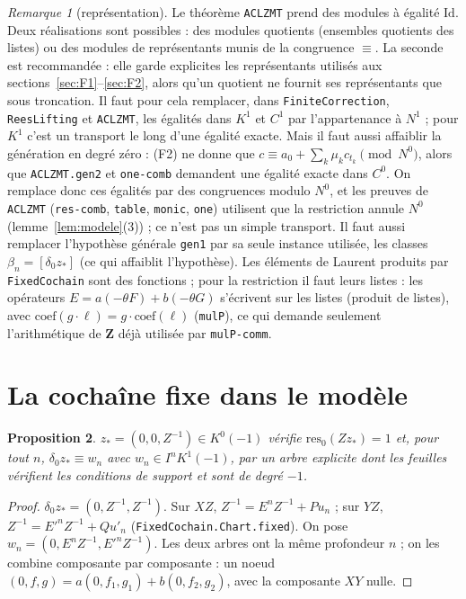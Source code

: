 \documentclass[11pt]{amsart}
\newtheorem{proposition}{Proposition}
\theoremstyle{remark}
\newtheorem{remark}[proposition]{Remarque}
\begin{document}
\begin{remark}[représentation]
Le théorème \texttt{ACLZMT} prend des modules à égalité $\mathrm{Id}$.
Deux réalisations sont possibles : des modules quotients (ensembles
quotients des listes) ou des modules de représentants munis de la
congruence $\equiv$. La seconde est recommandée : elle garde explicites
les représentants utilisés aux sections~\ref{sec:F1}--\ref{sec:F2}, alors
qu'un quotient ne fournit ses représentants que sous troncation. Il
faut pour cela remplacer, dans \texttt{FiniteCorrection},
\texttt{ReesLifting} et \texttt{ACLZMT}, les égalités dans $K^1$ et $C^1$
par l'appartenance à $N^1$ ; pour $K^1$ c'est un transport le long d'une
égalité exacte. Mais il faut aussi affaiblir la génération en degré zéro :
(F2) ne donne que $c\equiv a_0+\sum_k\mu_kc_{t_k}\pmod{N^0}$, alors que
\texttt{ACLZMT.gen2} et \texttt{one-comb} demandent une égalité exacte
dans $C^0$. On remplace donc ces égalités par des congruences modulo $N^0$,
et les preuves de \texttt{ACLZMT} (\texttt{res-comb}, \texttt{table},
\texttt{monic}, \texttt{one}) utilisent que la restriction annule $N^0$
(lemme~\ref{lem:modele}(3)) ; ce n'est pas un simple transport. Il faut aussi remplacer
l'hypothèse générale \texttt{gen1} par sa seule instance utilisée, les
classes $\beta_n=[\delta_0z_*]$ (ce qui affaiblit l'hypothèse).
Les éléments de Laurent produits par \texttt{FixedCochain} sont des
fonctions ; pour la restriction il faut leurs listes : les opérateurs
$E=a(-\theta F)+b(-\theta G)$ s'écrivent sur les listes (produit de
listes), avec $\text{coef}(g\cdot\ell)=g\cdot\text{coef}(\ell)$
(\texttt{mulP}), ce qui demande seulement l'arithmétique de $\mathbf Z$
déjà utilisée par \texttt{mulP-comm}.
\end{remark}

\section{La cochaîne fixe dans le modèle}

\begin{proposition}\label{prop:fixe}
$z_*=(0,0,Z^{-1})\in K^0(-1)$ vérifie $\mathrm{res}_0(Zz_*)=1$ et, pour
tout $n$, $\delta_0z_*\equiv w_n$ avec $w_n\in I^nK^1(-1)$, par un arbre
explicite dont les feuilles vérifient les conditions de support et sont
de degré $-1$.
\end{proposition}
\begin{proof}
$\delta_0z_*=(0,Z^{-1},Z^{-1})$. Sur $XZ$,
$Z^{-1}=E^nZ^{-1}+Pu_n$ ; sur $YZ$, $Z^{-1}=E'^nZ^{-1}+Qu'_n$
(\texttt{FixedCochain.Chart.fixed}). On pose
$w_n=(0,E^nZ^{-1},E'^nZ^{-1})$. Les deux arbres ont la même profondeur
$n$ ; on les combine composante par composante : un noeud
$(0,f,g)=a(0,f_1,g_1)+b(0,f_2,g_2)$, avec la composante $XY$ nulle.
\end{proof}
\end{document}
